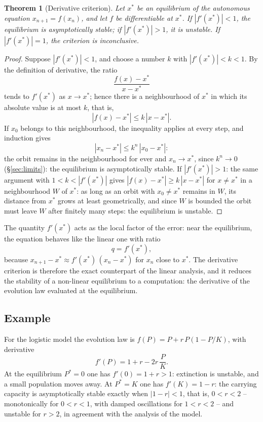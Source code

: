 \documentclass[11pt,a4paper]{article}
\theoremstyle{definition} \newtheorem{definition}{Definition} \theoremstyle{plain} \newtheorem{theorem}{Theorem}
\begin{document}
\begin{theorem}[Derivative criterion]\label{thm:derivative-criterion} Let $x^*$ be an equilibrium of the
autonomous equation $x_{n+1}=f(x_n)$, and let $f$ be differentiable at
$x^*$. If $|f'(x^*)|<1$, the equilibrium is asymptotically stable; if
$|f'(x^*)|>1$, it is unstable. If $|f'(x^*)|=1$, the criterion is
inconclusive.
\end{theorem}

\begin{proof} Suppose $|f'(x^*)|<1$, and choose a number $k$ with
$|f'(x^*)|<k<1$. By the definition of derivative, the ratio
\[ \frac{f(x)-x^*}{x-x^*} \]
tends to $f'(x^*)$ as $x\to x^*$; hence there is a neighbourhood of
$x^*$ in which its absolute value is at most $k$, that is,
\[ |f(x)-x^*| \le k\,|x-x^*|. \]
If $x_0$ belongs to this neighbourhood, the inequality applies at every
step, and induction gives
\[ |x_n-x^*| \le k^n\,|x_0-x^*|: \]
the orbit remains in the neighbourhood for ever and $x_n\to x^*$, since
$k^n\to 0$ (\S\ref{sec:limits}): the equilibrium is asymptotically stable. If
$|f'(x^*)|>1$: the same argument with $1<k<|f'(x^*)|$ gives
$|f(x)-x^*|\ge k\,|x-x^*|$ for $x\neq x^*$ in a neighbourhood $W$ of
$x^*$: as long as an orbit with $x_0\neq x^*$ remains in $W$, its
distance from $x^*$ grows at least geometrically, and since $W$ is
bounded the orbit must leave $W$ after finitely many steps: the
equilibrium is unstable. \end{proof}

The quantity $f'(x^*)$ acts as the local factor of the error: near the
equilibrium, the equation behaves like the linear one with ratio
\[ q = f'(x^*), \]
because $x_{n+1}-x^* \approx f'(x^*)\,(x_n-x^*)$ for $x_n$ close to
$x^*$. The derivative criterion is therefore the exact counterpart of
the linear analysis, and it reduces the stability of a non-linear
equilibrium to a computation: the derivative of the evolution law
evaluated at the equilibrium.

\subsection*{Example}

For the logistic model the evolution law is
$f(P) = P + r\,P(1-P/K)$, with derivative
\[ f'(P) = 1 + r - 2r\,\frac{P}{K}. \]
At the equilibrium $P^*=0$ one has $f'(0)=1+r>1$: extinction is
unstable, and a small population moves away. At $P^*=K$ one has
$f'(K)=1-r$: the carrying capacity is asymptotically stable exactly when
$|1-r|<1$, that is, $0<r<2$ -- monotonically for $0<r<1$, with damped
oscillations for $1<r<2$ -- and unstable for $r>2$, in agreement with the
analysis of the model.
\end{document}
